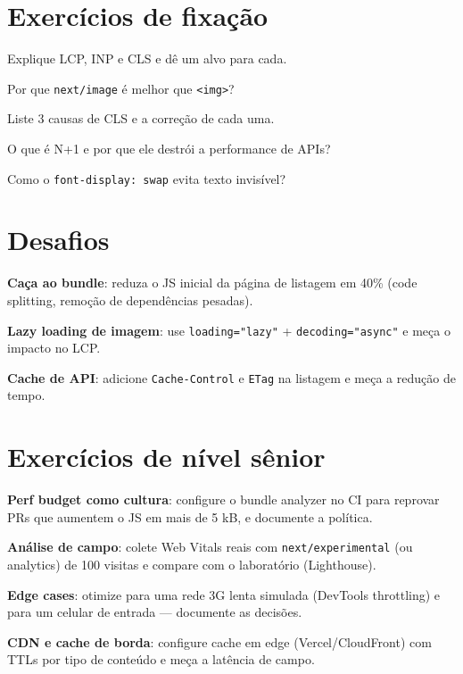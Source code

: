 \section{Exercícios de fixação}

\begin{exercicios}
  \item Explique LCP, INP e CLS e dê um alvo para cada.
  \item Por que \texttt{next/image} é melhor que \texttt{<img>}?
  \item Liste 3 causas de CLS e a correção de cada uma.
  \item O que é N+1 e por que ele destrói a performance de APIs?
  \item Como o \texttt{font-display: swap} evita texto invisível?
\end{exercicios}

\section{Desafios}

\begin{desafios}
  \item \textbf{Caça ao bundle}: reduza o JS inicial da página de listagem em 40\% (code splitting, remoção de dependências pesadas).
  \item \textbf{Lazy loading de imagem}: use \texttt{loading="lazy"} + \texttt{decoding="async"} e meça o impacto no LCP.
  \item \textbf{Cache de API}: adicione \texttt{Cache-Control} e \texttt{ETag} na listagem e meça a redução de tempo.
\end{desafios}

\section{Exercícios de nível sênior}

\begin{seniores}
  \item \textbf{Perf budget como cultura}: configure o bundle analyzer no CI para reprovar PRs que aumentem o JS em mais de 5 kB, e documente a política.
  \item \textbf{Análise de campo}: colete Web Vitals reais com \texttt{next/experimental} (ou analytics) de 100 visitas e compare com o laboratório (Lighthouse).
  \item \textbf{Edge cases}: otimize para uma rede 3G lenta simulada (DevTools throttling) e para um celular de entrada — documente as decisões.
  \item \textbf{CDN e cache de borda}: configure cache em edge (Vercel/CloudFront) com TTLs por tipo de conteúdo e meça a latência de campo.
\end{seniores}


